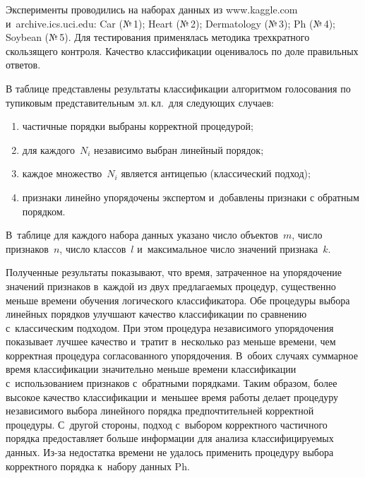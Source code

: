 \begin{multicols}{2}
  Эксперименты проводились на наборах данных из {\sf www.kaggle.com} 
  и~{\sf archive.ics.uci.edu}: Car (№\,1); Heart (№\,2); Dermatology (№\,3); Ph (№\,4); 
Soybean (№\,5). Для тестирования применялась методика трехкратного 
скользящего контроля. Качество классификации оценивалось по доле 
правильных ответов.
  
  В таблице представлены результаты классификации алгоритмом голосования 
по тупиковым представительным эл.\,кл.\ для следующих случаев: 
\begin{enumerate}[(1)]
\item частичные порядки выбраны корректной процедурой;\\[-15pt] 
\item для каждого~$N_i$ 
независимо выбран линейный порядок;\\[-15pt]
\item каждое множество~$N_i$ является 
антицепью (классический подход);\\[-15pt] 
\item признаки линейно упорядочены 
экспертом и~добавлены признаки с обратным порядком.
\end{enumerate}

 В~таблице для каждого 
набора данных указано число объектов~$m$, число признаков~$n$, число 
классов~$l$ и~максимальное число значений признака~$k$.
  
  Полученные результаты показывают, что время, затраченное на 
упорядочение значений признаков в~каждой из двух предлагаемых процедур, 
существенно меньше времени обучения логического классификатора. Обе 
процедуры выбора линейных порядков улучшают качество классификации по 
сравнению с~классическим подходом. При этом процедура независимого 
упорядочения показывает лучшее качество и~тратит в~несколько раз меньше 
времени, чем корректная процедура согласованного упорядочения. В~обоих 
случаях суммарное время классификации значительно меньше времени 
классификации с~использованием признаков с~обратными порядками. Таким 
образом, более высокое качество классификации и~меньшее время работы 
делает процедуру независимого выбора линейного порядка предпочтительней 
корректной процедуры. С~другой стороны, подход с~выбором корректного 
частичного порядка предоставляет больше информации для анализа 
классифицируемых данных. Из-за недостатка времени не удалось применить
процедуру выбора корректного порядка к~набору данных Ph.
  
 \vspace*{-3pt} 


\end{multicols}
